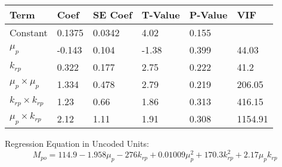 \documentclass[12pt,a4paper]{article}
\begin{document}
\begin{table}[h]
\centering
\label{my-label}
\begin{tabularx}{\textwidth}{@{}XXXXXX@{}}
\toprule
Term                                                                  & Coef   & SE Coef & T-Value & P-Value & VIF     \\ \midrule
Constant                                                              & 0.1375 & 0.0342  & 4.02    & 0.155   &         \\
$\mu_p$                                                               & -0.143 & 0.104   & -1.38   & 0.399   & 44.03   \\
$k_{rp}$                                                              & 0.322  & 0.177   & 2.75    & 0.222   & 41.2    \\
$\mu_p\times{\mu_p}$ & 1.334  & 0.478   & 2.79    & 0.219   & 206.05  \\
$k_{rp}\times{k_{rp}}$                                                & 1.23   & 0.66    & 1.86    & 0.313   & 416.15  \\
$\mu_p\times{k_{rp}}$                                                 & 2.12   & 1.11    & 1.91    & 0.308   & 1154.91 \\ \bottomrule
\end{tabularx}
\end{table}
\newline
\noindent
Regression Equation in Uncoded Units:
	\begin{equation}
		M_{po}=114.9-1.958\mu_p-276k_{rp}+0.01009\mu_p^2+170.3k_{rp}^2+2.17\mu_pk_{rp}
	\end{equation}

\clearpage
%
%
\end{document}
